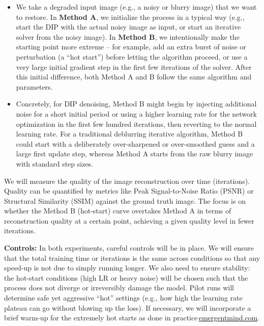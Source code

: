 \documentclass[11pt]{article}
\begin{document}
\begin{itemize}
  \item We take a degraded input image (e.g., a noisy or blurry image) that we want to restore. In \textbf{Method A}, we initialize the process in a typical way (e.g., start the DIP with the actual noisy image as input, or start an iterative solver from the noisy image). In \textbf{Method B}, we intentionally make the starting point more extreme -- for example, add an extra burst of noise or perturbation (a ``hot start'') before letting the algorithm proceed, or use a very large initial gradient step in the first few iterations of the solver. After this initial difference, both Method A and B follow the same algorithm and parameters.
  \item Concretely, for DIP denoising, Method B might begin by injecting additional noise for a short initial period or using a higher learning rate for the network optimization in the first few hundred iterations, then reverting to the normal learning rate. For a traditional deblurring iterative algorithm, Method B could start with a deliberately over-sharpened or over-smoothed guess and a large first update step, whereas Method A starts from the raw blurry image with standard step sizes.
\end{itemize}

We will measure the quality of the image reconstruction over time (iterations). Quality can be quantified by metrics like Peak Signal-to-Noise Ratio (PSNR) or Structural Similarity (SSIM) against the ground truth image. The focus is on whether the Method B (hot-start) curve overtakes Method A in terms of reconstruction quality at a certain point, achieving a given quality level in fewer iterations.

\textbf{Controls:} In both experiments, careful controls will be in place. We will ensure that the total training time or iterations is the same across conditions so that any speed-up is not due to simply running longer. We also need to ensure stability: the hot-start conditions (high LR or heavy noise) will be chosen such that the process does not diverge or irreversibly damage the model. Pilot runs will determine safe yet aggressive ``hot'' settings (e.g., how high the learning rate plateau can go without blowing up the loss). If necessary, we will incorporate a brief warm-up for the extremely hot starts as done in practice\,\href{https://www.emergentmind.com/topics/warmup-stable-decay-wsd-schedules#:~:text=,while too large can cause}{emergentmind.com}.
\end{document}

